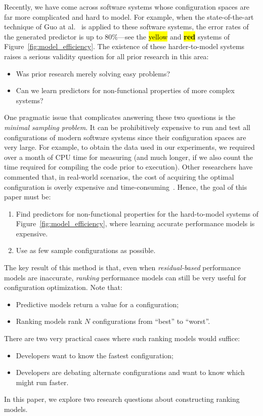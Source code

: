 \documentclass[sigconf]{acmart}
\DeclareRobustCommand{\hlyellow}[1]{{\sethlcolor{yellow}\hl{#1}}}
\DeclareRobustCommand{\hlred}[1]{{\sethlcolor{Myred}\textbf{\textcolor{white}{\hl{#1}}}}}
\begin{document}
Recently, we have come across software systems whose configuration spaces
are far more complicated and hard to model. For example, when the state-of-the-art technique of Guo at al.~\cite{guo2013variability} is applied to these software systems, the error
rates of the generated predictor is up to 80\%---see the 
\hlyellow{yellow} and
\hlred{red} systems of Figure~\ref{fig:model_efficiency}. The existence
of these harder-to-model systems raises a serious validity question 
for all prior research in this area:
\begin{itemize}
\item Was prior research merely solving easy problems?
\item Can we learn predictors for non-functional properties of more complex systems?
\end{itemize}
One pragmatic issue that complicates answering these two questions is the {\em minimal sampling problem}. It can be prohibitively expensive to run and test all configurations
of modern software systems since their configuration spaces are very large. For example, to obtain the data used in our experiments, we required over a month of  CPU time for measuring
(and much longer, if we also count the time required for compiling the code prior to
execution). Other researchers have commented that, in real-world scenarios, the cost
of acquiring the optimal configuration is overly expensive and time-consuming~\cite{weiss2008maximizing}. Hence, the goal of this paper must be:
\begin{enumerate}
\item Find  predictors for non-functional properties for the hard-to-model systems of Figure~\ref{fig:model_efficiency}, where learning accurate performance models is expensive.
\item Use as few sample configurations as possible.
\end{enumerate}

 
The key result of this method is that, even when {\em residual-based} performance models are
inaccurate, {\em ranking} performance models can still be very useful for configuration optimization. Note that:
\begin{itemize}
\item Predictive models return a value for a configuration;
\item Ranking models rank $N$ configurations from ``best'' to ``worst''.
\end{itemize}
There are two very practical cases where such ranking models would suffice:
\begin{itemize}
\item Developers want to know the fastest configuration;
\item Developers are debating alternate configurations and want to know
which might run faster.
\end{itemize}
In this paper, we explore two research questions about  constructing ranking models.
\end{document}
